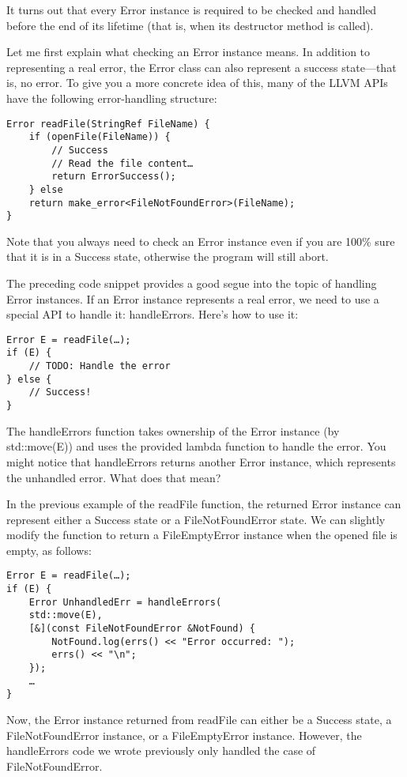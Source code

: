 It turns out that every Error instance is required to be checked and handled before the end of its lifetime (that is, when its destructor method is called).

Let me first explain what checking an Error instance means. In addition to representing a real error, the Error class can also represent a success state—that is, no error. To give you a more concrete idea of this, many of the LLVM APIs have the following error-handling structure:

\begin{lstlisting}[style=styleCXX]
Error readFile(StringRef FileName) {
	if (openFile(FileName)) {
		// Success
		// Read the file content…
		return ErrorSuccess();
	} else
	return make_error<FileNotFoundError>(FileName);
}
\end{lstlisting}

Note that you always need to check an Error instance even if you are 100\% sure that it is in a Success state, otherwise the program will still abort.

The preceding code snippet provides a good segue into the topic of handling Error instances. If an Error instance represents a real error, we need to use a special API to handle it: handleErrors. Here's how to use it:

\begin{lstlisting}[style=styleCXX]
Error E = readFile(…);
if (E) {
	// TODO: Handle the error
} else {
    // Success!
}
\end{lstlisting}

The handleErrors function takes ownership of the Error instance (by std::move(E)) and uses the provided lambda function to handle the error. You might notice that handleErrors returns another Error instance, which represents the unhandled error. What does that mean?

In the previous example of the readFile function, the returned Error instance can represent either a Success state or a FileNotFoundError state. We can slightly modify the function to return a FileEmptyError instance when the opened file is empty, as follows:

\begin{lstlisting}[style=styleCXX]
Error E = readFile(…);
if (E) {
	Error UnhandledErr = handleErrors(
	std::move(E),
	[&](const FileNotFoundError &NotFound) {
		NotFound.log(errs() << "Error occurred: ");
		errs() << "\n";
	});
	…
}
\end{lstlisting}

Now, the Error instance returned from readFile can either be a Success state, a FileNotFoundError instance, or a FileEmptyError instance. However, the handleErrors code we wrote previously only handled the case of FileNotFoundError.

